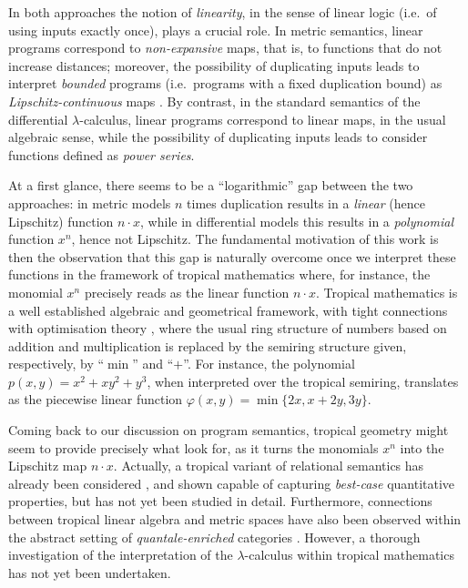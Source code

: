 \documentclass[submission,%
]{eptcs}
\begin{document}
In both approaches the notion of \emph{linearity}, in the sense of linear logic \cite{girardLl} (i.e.~of using inputs exactly once), plays a crucial role.
In metric semantics, linear programs correspond to \emph{non-expansive} maps, that is, to functions that do not increase distances; moreover, the possibility of duplicating inputs leads to interpret \emph{bounded} programs (i.e.~programs with a fixed duplication bound) as \emph{Lipschitz-continuous} maps \cite{Gaboardi2017}.
By contrast, in the standard semantics of the differential $\lambda$-calculus, linear programs correspond to linear maps, in the usual algebraic sense, while the possibility of duplicating inputs leads to consider functions defined as \emph{power series}.

At a first glance, there seems to be a  ``logarithmic'' gap between the two approaches:
in metric models $n$ times duplication results in a \emph{linear} (hence Lipschitz) function $n\cdot x$, while in differential models this results in a \emph{polynomial} function $x^{n}$, hence not Lipschitz.
The fundamental motivation of this work is then the observation that 
this gap is naturally overcome once we interpret these functions in the framework of tropical mathematics where, for instance, the monomial $x^{n}$ precisely reads as the linear function $n\cdot x$.
Tropical mathematics \cite{Simon} is a well established algebraic and geometrical framework, with tight connections with optimisation theory \cite{Sturmfelds}, where the usual ring structure of numbers based on addition and multiplication is replaced by the semiring structure given, respectively, by ``$\min$'' and ``$+$''.
For instance, the polynomial $p(x,y)=x^{2}+xy^{2}+y^{3}$, when interpreted over the tropical semiring, translates as the piecewise linear function
$
\varphi(x,y)=\min\{2x, x+2y, 3y\}
$.

Coming back to our discussion on program semantics, tropical geometry might seem to provide precisely what look for, as it turns the monomials $x^{n}$ into the Lipschitz map  $n\cdot x$.
Actually, a tropical variant of relational semantics has already been considered \cite{Manzo2013}, and shown capable of capturing \emph{best-case} quantitative properties, but has not yet been studied in detail. Furthermore, connections between tropical linear algebra and metric spaces have also been observed \cite{Fuji} within the abstract setting of \emph{quantale-enriched} categories \cite{Hofmann2014, Stubbe2014}.
However, a thorough investigation of the interpretation of the $\lambda$-calculus within tropical mathematics has not yet been undertaken. 
\end{document}

